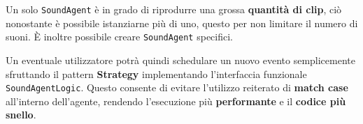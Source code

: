 Un solo \texttt{SoundAgent} è in grado di riprodurre una grossa \textbf{quantità di clip}, ciò nonostante è possibile istanziarne più di uno, questo per non limitare il numero di suoni. È inoltre possibile creare \texttt{SoundAgent} specifici.

Un eventuale utilizzatore potrà quindi schedulare un nuovo evento semplicemente sfruttando il pattern \textbf{Strategy} implementando l'interfaccia funzionale \texttt{SoundAgentLogic}.
Questo consente di evitare l'utilizzo reiterato di \textbf{match case} all'interno dell'agente, rendendo l'esecuzione più \textbf{performante} e il \textbf{codice più snello}.